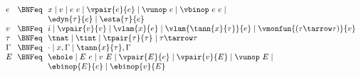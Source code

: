 \begin{flushleft}

\begin{minipage}[t]{\columnwidth}
\\
$\begin{array}{l@{~~}c@{~~}l}
  e & \BNFeq & x \mid v \mid e~e \mid \vpair{e}{e} \mid \vunop~e \mid \vbinop~e~e \mid
\\ & & \edyn{\tau}{e} \mid \esta{\tau}{e}
\\
  v & \BNFeq & i \mid \vpair{v}{v} \mid \vlam{x}{e} \mid \vlam{\tann{x}{\tau}}{e} \mid \vmonfun{(\tau\tarrow\tau)}{v}
\\
  \tau & \BNFeq & \tnat \mid \tint \mid \tpair{\tau}{\tau} \mid \tau \tarrow \tau
\\
  \Gamma & \BNFeq & \cdot \mid x,\Gamma \mid \tann{x}{\tau},\Gamma
\\
  E & \BNFeq & \ehole \mid E~e \mid v~E \mid
                  \vpair{E}{e} \mid \vpair{v}{E} \mid \vunop~E \mid
\\ & &            \ebinop{E}{e} \mid \ebinop{v}{E}
\end{array}$

\smallskip
{}\\
\begin{mathpar}










\end{mathpar}
\end{minipage}
\end{flushleft}

